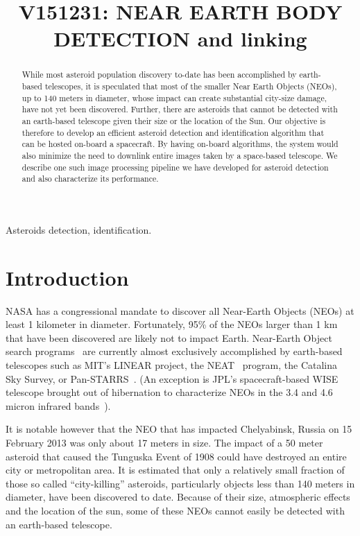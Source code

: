\documentclass{article}
\title{V151231: NEAR EARTH BODY DETECTION and linking}
\begin{document}
%
\maketitle
%
\begin{abstract}
While most asteroid population discovery to-date has been accomplished  by earth-based telescopes, it is speculated that most of the smaller Near Earth Objects (NEOs), up to 140 meters in diameter, whose impact can create substantial city-size damage, have not yet been discovered.  Further, there are asteroids that cannot be detected with an earth-based telescope given their size or the location of the Sun.  Our objective is therefore to develop an efficient asteroid detection and identification algorithm that can be hosted on-board a spacecraft.  By having on-board algorithms, the system would also minimize the need to downlink entire images taken by a space-based telescope. We describe one such image processing pipeline we have developed for asteroid detection and also characterize its performance.
 
\end{abstract}
%
\begin{keywords}
Asteroids detection, identification. 
\end{keywords}
%
\section{Introduction}
\label{sec:intro}

NASA has a congressional mandate to discover all Near-Earth Objects (NEOs) at least 1 kilometer in diameter.  Fortunately, 95\% of the NEOs larger than 1 km that have been discovered are likely not to impact Earth.  
Near-Earth Object search programs~\cite{stokes2002near} are currently almost exclusively accomplished by earth-based telescopes such as MIT's LINEAR \cite{evans2003detection}  project, the NEAT~\cite{neat2014} program, the Catalina Sky Survey, or  Pan-STARRS~\cite{denneau2013pan}.  (An exception is JPL's spacecraft-based WISE telescope brought out of hibernation to characterize NEOs in the 3.4 and 4.6 micron infrared bands~\cite{wise2014}). 

It is notable however that the NEO that has impacted Chelyabinsk, Russia on 15 February 2013 was only about 17 meters in size.  The impact of a 50 meter asteroid that caused the Tunguska Event of 1908 could have destroyed an entire city or metropolitan area. It is estimated that only a relatively small fraction of those so called ``city-killing'' asteroids, particularly objects less than 140 meters in diameter, have been discovered to date. Because of their size, atmospheric effects and the location of the sun, some of these NEOs cannot easily be detected with an earth-based telescope.  
\end{document}
